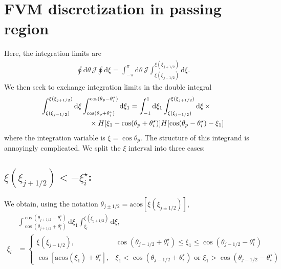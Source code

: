 \documentclass[11pt,a4paper]{article}
\newcommand{\rd}{\ensuremath{\mathrm{d}}}
\begin{document}
\section{FVM discretization in passing region}
Here, the integration limits are
\begin{align}
\oint\rd\theta \, \mathcal{J} \oint \rd\xi = \int_{-\pi}^\pi \rd\theta\, \mathcal{J}  \int_{\xi(\xi_{j-1/2})}^{\xi(\xi_{j+1/2})}\rd\xi.
\end{align}
We then seek to exchange integration limits in the double integral
\begin{align}
\int_{\xi(\xi_{j-1/2})}^{\xi(\xi_{j+1/2})}\rd\xi \int_{\cos(\theta_p+\theta_i^\star)}^{\cos(\theta_p-\theta_i^\star)}\rd \xi_1 &= \int_{-1}^1\rd\xi_1 \int_{\xi(\xi_{j-1/2})}^{\xi(\xi_{j+1/2})}\rd\xi \,  \times \nonumber \\
& \hspace{-20mm} \times H[\xi_1 - \cos(\theta_p+\theta_i^\star)] H[\cos(\theta_p-\theta_i^\star) - \xi_1]
\end{align}
where the integration variable is $\xi = \cos\theta_p$. The structure of this integrand is annoyingly complicated. We split the $\xi$ interval into three cases:

\subsection{$\xi(\xi_{j+1/2}) < -\xi_i^\star$:}
We obtain, using the notation $\theta_{j\pm1/2} = \mathrm{acos}[\xi(\xi_{j\pm1/2})]$,
\begin{align}
&\int_{\cos(\theta_{j+1/2}+\theta_i^\star)}^{\cos(\theta_{j+1/2}-\theta_i^\star)}\rd \xi_1 \int_{\xi_l}^{\xi(\xi_{j+1/2})} \rd \xi, \nonumber \\
\xi_l &= \begin{cases}
\xi(\xi_{j-1/2}), & \cos(\theta_{j-1/2}+\theta_i^\star) \leq \xi_1 \leq \cos(\theta_{j-1/2}-\theta_i^\star) \\
\cos[\mathrm{acos}(\xi_1)+\theta_i^\star], & \xi_1 < \cos(\theta_{j-1/2}+\theta_i^\star) \text{ or } \xi_1 > \cos(\theta_{j-1/2}-\theta_i^\star) 
\end{cases}
\end{align}
\end{document}
